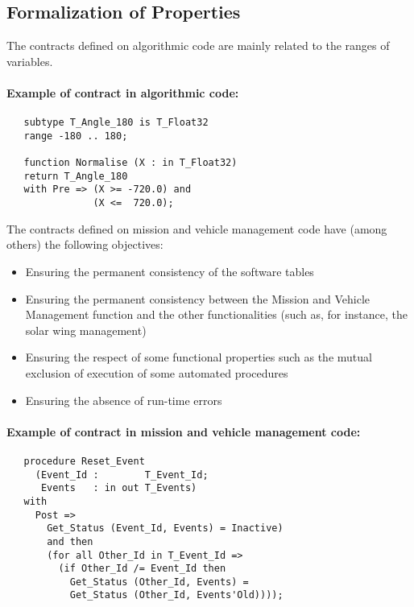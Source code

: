 \documentclass[10pt,a4paper,twocolumn]{article}
\begin{document}
\subsection{Formalization of Properties}

The contracts defined on algorithmic code are mainly related to the ranges of variables.

\paragraph{Example of contract in algorithmic code:}

\begin{lstlisting}
   subtype T_Angle_180 is T_Float32
   range -180 .. 180;

   function Normalise (X : in T_Float32)
   return T_Angle_180
   with Pre => (X >= -720.0) and
               (X <=  720.0);
\end{lstlisting}

The contracts defined on mission and vehicle management code have (among others) the following objectives:

\begin{itemize}
\item Ensuring the permanent consistency of the software tables
\item Ensuring the permanent consistency between the Mission and Vehicle Management function and the other functionalities (such as, for instance, the solar wing management)
\item Ensuring the respect of some functional properties such as the mutual exclusion of execution of some automated procedures
\item Ensuring the absence of run-time errors
\end{itemize}

\paragraph{Example of contract in mission and vehicle management code:}

\begin{lstlisting}
   procedure Reset_Event
     (Event_Id :        T_Event_Id;
      Events   : in out T_Events)
   with
     Post =>
       Get_Status (Event_Id, Events) = Inactive)
       and then
       (for all Other_Id in T_Event_Id =>
         (if Other_Id /= Event_Id then
           Get_Status (Other_Id, Events) =
           Get_Status (Other_Id, Events'Old))));
\end{lstlisting}
\end{document}
